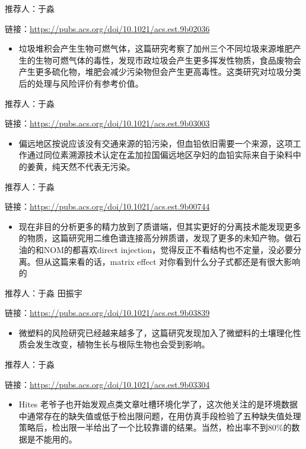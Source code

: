 \documentclass[
]{book}
\providecommand{\tightlist}{%
  \setlength{\itemsep}{0pt}\setlength{\parskip}{0pt}}
\begin{document}
推荐人：于淼

链接：\url{https://pubs.acs.org/doi/10.1021/acs.est.9b02036}

\begin{itemize}
\tightlist
\item
  垃圾堆积会产生生物可燃气体，这篇研究考察了加州三个不同垃圾来源堆肥产生的生物可燃气体的毒性，发现市政垃圾会产生更多挥发性物质，食品废物会产生更多硫化物，堆肥会减少污染物但会产生更高毒性。这类研究对垃圾分类后的处理与风险评价有参考价值。
\end{itemize}

推荐人：于淼

链接：\url{https://pubs.acs.org/doi/10.1021/acs.est.9b03003}

\begin{itemize}
\tightlist
\item
  偏远地区按说应该没有交通来源的铅污染，但血铅依旧需要一个来源，这项工作通过同位素溯源技术认定在孟加拉国偏远地区孕妇的血铅实际来自于染料中的姜黄，纯天然不代表无污染。
\end{itemize}

推荐人：于淼

链接：\url{https://pubs.acs.org/doi/10.1021/acs.est.9b00744}

\begin{itemize}
\tightlist
\item
  现在非目的分析更多的精力放到了质谱端，但其实更好的分离技术能发现更多的物质，这篇研究用二维色谱连接高分辨质谱，发现了更多的未知产物。做石油的和NOM的都喜欢direct injection，觉得反正不看结构也不定量，没必要分离。但从这篇来看的话，matrix effect 对你看到什么分子式都还是有很大影响的
\end{itemize}

推荐人：于淼 田振宇

链接：\url{https://pubs.acs.org/doi/10.1021/acs.est.9b03839}

\begin{itemize}
\tightlist
\item
  微塑料的风险研究已经越来越多了，这篇研究发现加入了微塑料的土壤理化性质会发生改变，植物生长与根际生物也会受到影响。
\end{itemize}

推荐人：于淼

链接：\url{https://pubs.acs.org/doi/10.1021/acs.est.9b03304}

\begin{itemize}
\tightlist
\item
  Hites 老爷子也开始发观点类文章吐槽环境化学了，这次他关注的是环境数据中通常存在的缺失值或低于检出限问题，在用仿真手段检验了五种缺失值处理策略后，检出限一半给出了一个比较靠谱的结果。当然，检出率不到80\%的数据是不能用的。
\end{itemize}
\end{document}
